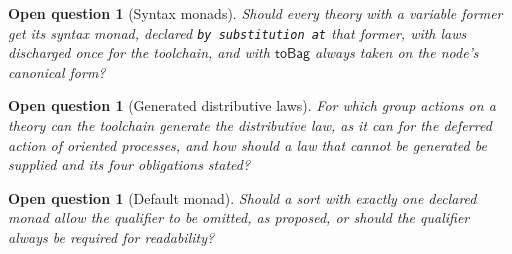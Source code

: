 \documentclass[11pt]{article}
\theoremstyle{branddef}
\theoremstyle{brandplain}
\theoremstyle{brandrem}
\newtheorem{question}[definition]{Open question}
\begin{document}
\begin{question}[Syntax monads]
Should every theory with a variable former get its syntax monad, declared
\texttt{by substitution at} that former, with laws discharged once for the
toolchain, and with \(\mathsf{toBag}\) always taken on the node's canonical
form?
\end{question}

\begin{question}[Generated distributive laws]
For which group actions on a theory can the toolchain generate the
distributive law, as it can for the deferred action of oriented processes, and
how should a law that cannot be generated be supplied and its four obligations
stated?
\end{question}

\begin{question}[Default monad]
Should a sort with exactly one declared monad allow the qualifier to be omitted,
as proposed, or should the qualifier always be required for readability?
\end{question}
\end{document}

